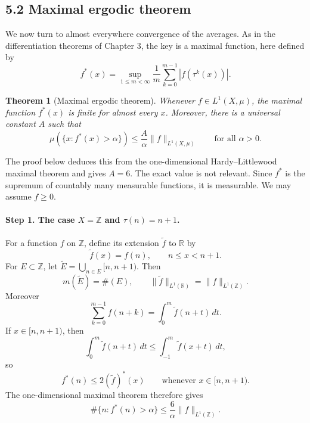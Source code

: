 \documentclass[11pt,openany]{book}
\newtheorem{theorem}{Theorem}[section]
\begin{document}
\subsection*{5.2 Maximal ergodic theorem}

We now turn to almost everywhere convergence of the averages. As in the differentiation theorems of Chapter 3, the key is a maximal function, here defined by
\begin{equation}
f^*(x)=\sup_{1\leq m<\infty}\frac1m\sum_{k=0}^{m-1}|f(\tau^k(x))|.
\tag{23}
\end{equation}

\begin{theorem}[Maximal ergodic theorem]
Whenever $f\in L^1(X,\mu)$, the maximal function $f^*(x)$ is finite for almost every $x$. Moreover, there is a universal constant $A$ such that
\begin{equation}
\mu(\{x:f^*(x)>\alpha\})\leq\frac{A}{\alpha}\|f\|_{L^1(X,\mu)}
\qquad\text{for all }\alpha>0.
\tag{24}
\end{equation}
\end{theorem}

The proof below deduces this from the one-dimensional Hardy--Littlewood maximal theorem and gives $A=6$. The exact value is not relevant. Since $f^*$ is the supremum of countably many measurable functions, it is measurable. We may assume $f\geq0$.

\paragraph{Step 1. The case $X=\mathbb Z$ and $\tau(n)=n+1$.}
For a function $f$ on $\mathbb Z$, define its extension $\widetilde f$ to $\mathbb R$ by
\[
\widetilde f(x)=f(n),\qquad n\leq x<n+1.
\]
For $E\subset\mathbb Z$, let $\widetilde E=\bigcup_{n\in E}[n,n+1)$. Then
\[
m(\widetilde E)=\#(E),
\qquad
\|\widetilde f\|_{L^1(\mathbb R)}=\|f\|_{L^1(\mathbb Z)}.
\]
Moreover
\[
\sum_{k=0}^{m-1}f(n+k)=\int_0^m\widetilde f(n+t)\,dt.
\]
If $x\in[n,n+1)$, then
\[
\int_0^m\widetilde f(n+t)\,dt
\leq\int_{-1}^{m}\widetilde f(x+t)\,dt,
\]
so
\begin{equation}
f^*(n)\leq2(\widetilde f)^*(x)
\qquad\text{whenever }x\in[n,n+1).
\tag{25}
\end{equation}
The one-dimensional maximal theorem therefore gives
\begin{equation}
\#\{n:f^*(n)>\alpha\}
\leq\frac6\alpha\|f\|_{L^1(\mathbb Z)}.
\tag{26}
\end{equation}
\end{document}
